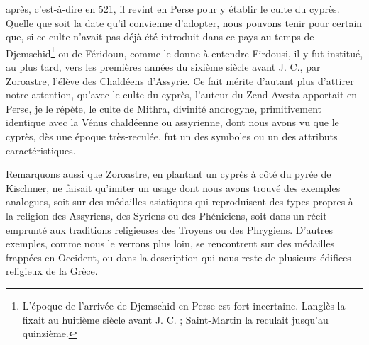 \documentclass[a4paper, 11pt, oneside, polutonikogreek, french]{article}
\begin{document}
après, c'est-à-dire en 521, il revint en Perse pour y établir le culte du cyprès. Quelle que soit la date qu'il convienne d'adopter, nous pouvons tenir pour certain que, si ce culte n'avait pas déjà été introduit dans ce pays au temps de Djemschid\footnote{L'époque de l'arrivée de Djemschid en Perse est fort incertaine. Langlès la fixait au huitième siècle avant J. C. ; Saint-Martin la reculait jusqu'au quinzième.} ou de Féridoun, comme le donne à entendre Firdousi, il y fut institué, au plus tard, vers les premières années du sixième siècle avant J. C., par Zoroastre, l'élève des Chaldéens d'Assyrie. Ce fait mérite d'autant plus d'attirer notre attention, qu'avec le culte du cyprès, l'auteur du Zend-Avesta apportait en Perse, je le répète, le culte de Mithra, divinité androgyne, primitivement identique avec la Vénus chaldéenne ou assyrienne, dont nous avons vu que le cyprès, dès une époque très-reculée, fut un des symboles ou un des attributs caractéristiques.

Remarquons aussi que Zoroastre, en plantant un cyprès à côté du pyrée de Kischmer, ne faisait qu'imiter un usage dont nous avons trouvé des exemples analogues, soit sur des médailles asiatiques qui reproduisent des types propres à la religion des Assyriens, des Syriens ou des Phéniciens, soit dans un récit emprunté aux traditions religieuses des Troyens ou des Phrygiens. D'autres exemples, comme nous le verrons plus loin, se rencontrent sur des médailles frappées en Occident, ou dans la description qui nous reste de plusieurs édifices religieux de la Grèce.
\end{document}
